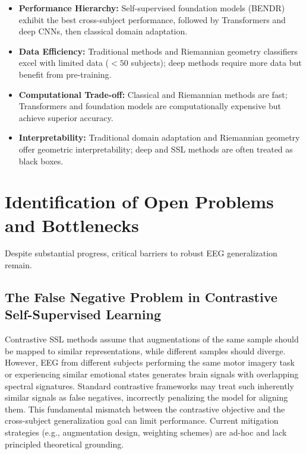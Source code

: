 \documentclass[11pt]{article}
\begin{document}
\begin{itemize}
    \item \textbf{Performance Hierarchy:} Self-supervised foundation models (BENDR) exhibit the best cross-subject performance, followed by Transformers and deep CNNs, then classical domain adaptation.
    
    \item \textbf{Data Efficiency:} Traditional methods and Riemannian geometry classifiers excel with limited data ($< 50$ subjects); deep methods require more data but benefit from pre-training.
    
    \item \textbf{Computational Trade-off:} Classical and Riemannian methods are fast; Transformers and foundation models are computationally expensive but achieve superior accuracy.
    
    \item \textbf{Interpretability:} Traditional domain adaptation and Riemannian geometry offer geometric interpretability; deep and SSL methods are often treated as black boxes.
\end{itemize}

\section{Identification of Open Problems and Bottlenecks}\label{sec:challenges}

Despite substantial progress, critical barriers to robust EEG generalization remain.

\subsection{The False Negative Problem in Contrastive Self-Supervised Learning}

Contrastive SSL methods assume that augmentations of the same sample should be mapped to similar representations, while different samples should diverge. However, EEG from different subjects performing the same motor imagery task or experiencing similar emotional states generates brain signals with overlapping spectral signatures. Standard contrastive frameworks may treat such inherently similar signals as false negatives, incorrectly penalizing the model for aligning them. This fundamental mismatch between the contrastive objective and the cross-subject generalization goal can limit performance. Current mitigation strategies (e.g., augmentation design, weighting schemes) are ad-hoc and lack principled theoretical grounding.
\end{document}
